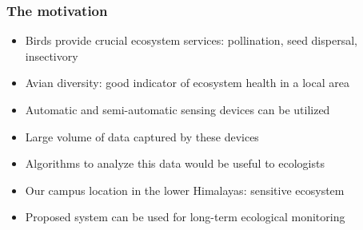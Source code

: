 \documentclass[mathserif]{beamer}
\begin{document}
\begin{frame}
\frametitle{The motivation}
\begin{itemize}
\item<2-> Birds provide crucial ecosystem services: pollination, seed dispersal,
insectivory
\item<3-> Avian diversity: good indicator of ecosystem health in a local area
\item<4-> Automatic and semi-automatic sensing devices can be utilized
\item<5-> Large volume of data captured by these devices
\item<6-> Algorithms to analyze this data would be useful to ecologists
\item<7-> Our campus location in the lower Himalayas: sensitive ecosystem
\item<8-> Proposed system can be used for long-term ecological monitoring
\end{itemize}
\end{frame}
\end{document}
